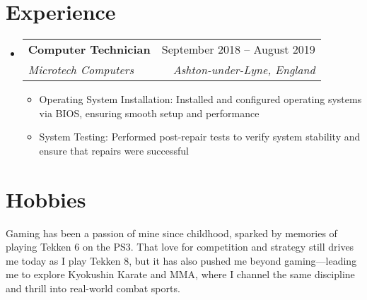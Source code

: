\documentclass[letterpaper,11pt]{article}
\makeatletter
\newcommand{\resumeItem}[1]{
  \item\small{
    {#1 \vspace{-2pt}}
  }
}
\newcommand{\resumeSubheading}[4]{
  \vspace{-2pt}\item
    \begin{tabular*}{0.97\textwidth}[t]{l@{\extracolsep{\fill}}r}
      \textbf{#1} & #2 \\
      \textit{\small#3} & \textit{\small #4} \\
    \end{tabular*}\vspace{-7pt}
}
\newcommand{\resumeSubHeadingListStart}{\begin{itemize}[leftmargin=0.15in, label={}]}
\newcommand{\resumeSubHeadingListEnd}{\end{itemize}}
\newcommand{\resumeItemListStart}{\begin{itemize}}
\newcommand{\resumeItemListEnd}{\end{itemize}\vspace{-5pt}}
\makeatother
\begin{document}
\section{Experience}
  \resumeSubHeadingListStart
    \resumeSubheading
      {Computer Technician}{September 2018 -- August 2019}
      {Microtech Computers}{Ashton-under-Lyne, England}
      \resumeItemListStart
        \resumeItem{Operating System Installation: Installed and configured operating systems via BIOS, ensuring smooth setup and performance}
        \resumeItem{System Testing: Performed post-repair tests to verify system stability and ensure that repairs were successful }
    \resumeItemListEnd
  \resumeSubHeadingListEnd

\section{Hobbies}
  \resumeSubHeadingListStart

     Gaming has been a passion of mine since childhood, sparked by memories of playing Tekken 6 on the PS3. That love for competition and strategy still drives me today as I play Tekken 8, but it has also pushed me beyond gaming—leading me to explore Kyokushin Karate and MMA, where I channel the same discipline and thrill into real-world combat sports.
  \resumeSubHeadingListEnd
\end{document}
